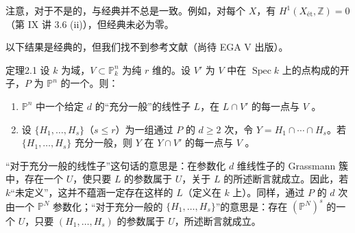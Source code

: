 注意，对于不是的，与经典并不总是一致。例如，对每个 $X$，有 $H^1(X_{\text{ét}},\mathbb Z)=0$（第 IX 讲 3.6 (ii)），但经典未必为零。

以下结果是经典的，但我们找不到参考文献（尚待 EGA V 出版）。
\begin{SGAresult}{定理}{2.1}
设 $k$ 为域，$V\subset\mathbb P^n_k$ 为纯 $r$ 维的。设 $V'$ 为 $V$ 中在 $\operatorname{Spec}k$ 上的点构成的开子，$P$ 为 $\mathbb P^n$ 的一个。则：
\begin{enumerate}
\item[(i)] $\mathbb P^n$ 中一个给定 $d$ 的“充分一般”的线性子 $L$，在 $L\cap V'$ 的每一点与 $V$ 。
\item[(ii)] 设 $\{H_1,\ldots,H_s\}$（$s\leq r$）为一组通过 $P$ 的 $d\geq2$ 次，令 $Y=H_1\cap\cdots\cap H_s$。若 $\{H_1,\ldots,H_s\}$ 充分一般，则 $Y$ 在 $Y\cap V'$ 的每一点与 $V$ 。
\end{enumerate}
\end{SGAresult}
“对于充分一般的线性子”这句话的意思是：在参数化 $d$ 维线性子的 Grassmann 簇中，存在一个 $U$，使只要 $L$ 的参数属于 $U$，关于 $L$ 的所述断言就成立。因此，若 $k$“未定义”，这并不蕴涵一定存在这样的 $L$（定义在 $k$ 上）。同样，通过 $P$ 的 $d$ 次由一个 $\mathbb P^N$ 参数化；“对于充分一般的 $\{H_1,\ldots,H_s\}$”的意思是：存在 $(\mathbb P^N)^s$ 的一个 $U$，只要 $(H_1,\ldots,H_s)$ 的参数属于 $U$，所述断言就成立。
